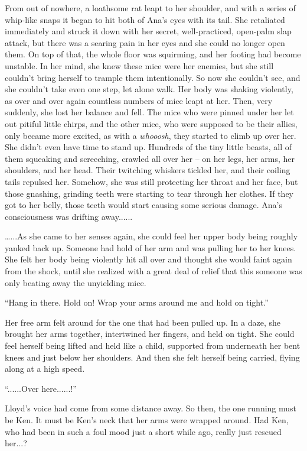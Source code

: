 \documentclass[
]{article}
\begin{document}
From out of nowhere, a loathsome rat leapt to her shoulder, and with a
series of whip-like snaps it began to hit both of Ana's eyes with its
tail. She retaliated immediately and struck it down with her secret,
well-practiced, open-palm slap attack, but there was a searing pain in
her eyes and she could no longer open them. On top of that, the whole
floor was squirming, and her footing had become unstable. In her mind,
she knew these mice were her enemies, but she still couldn't bring
herself to trample them intentionally. So now she couldn't see, and she
couldn't take even one step, let alone walk. Her body was shaking
violently, as over and over again countless numbers of mice leapt at
her. Then, very suddenly, she lost her balance and fell. The mice who
were pinned under her let out pitiful little chirps, and the other mice,
who were supposed to be their allies, only became more excited, as with
a \emph{whooosh}, they started to climb up over her. She didn't even
have time to stand up. Hundreds of the tiny little beasts, all of them
squeaking and screeching, crawled all over her -- on her legs, her arms,
her shoulders, and her head. Their twitching whiskers tickled her, and
their coiling tails repulsed her. Somehow, she was still protecting her
throat and her face, but those gnashing, grinding teeth were starting to
tear through her clothes. If they got to her belly, those teeth would
start causing some serious damage. Ana's consciousness was drifting
away......

\ldots...As she came to her senses again, she could feel her upper body
being roughly yanked back up. Someone had hold of her arm and was
pulling her to her knees. She felt her body being violently hit all over
and thought she would faint again from the shock, until she realized
with a great deal of relief that this someone was only beating away the
unyielding mice.

``Hang in there. Hold on! Wrap your arms around me and hold on tight.''

Her free arm felt around for the one that had been pulled up. In a daze,
she brought her arms together, intertwined her fingers, and held on
tight. She could feel herself being lifted and held like a child,
supported from underneath her bent knees and just below her shoulders.
And then she felt herself being carried, flying along at a high speed.

``......Over here......!''

Lloyd's voice had come from some distance away. So then, the one running
must be Ken. It must be Ken's neck that her arms were wrapped around.
Had Ken, who had been in such a foul mood just a short while ago, really
just rescued her...?
\end{document}

